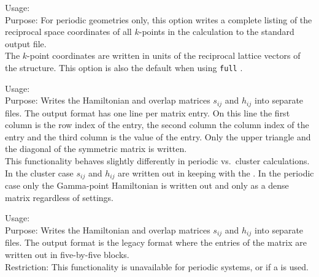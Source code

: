 {
  \noindent
  Usage:   \\[1.0ex]
  Purpose: For periodic geometries only, this option writes a complete
  listing of the reciprocal space coordinates of all $k$-points in the
  calculation to the standard output file. \\ 
}
The $k$-point coordinates are written in units of the reciprocal
lattice vectors of the structure. This option is also the default when
using  \texttt{full} . 

{
  \noindent
  Usage:   \\[1.0ex]
  Purpose: Writes the Hamiltonian and overlap matrices $s_{ij}$ and
  $h_{ij}$ into separate files. The output format has one line per
  matrix entry. On this line the first column is the row index of the
  entry, the second column the column index of the entry and the third
  column is the value of the entry. Only the upper triangle and the
  diagonal of the symmetric matrix is written. \\[1.0ex]
  This functionality behaves slightly differently in periodic vs.~cluster
  calculations. In the cluster case $s_{ij}$ and $h_{ij}$ are written
  out in keeping with the . In the
  periodic case only the Gamma-point Hamiltonian is written out and only as
  a dense matrix regardless of  settings.\\[1.0ex]
}

{
  \noindent
  Usage:   \\[1.0ex]
  Purpose: Writes the Hamiltonian and overlap matrices $s_{ij}$ and
  $h_{ij}$ into separate files. The output format is the legacy format
  where the entries of the matrix are written out in five-by-five
  blocks. \\[1.0ex]
  Restriction: This functionality is unavailable for periodic systems,
    or if a  is used. \\[1.0ex]
}


